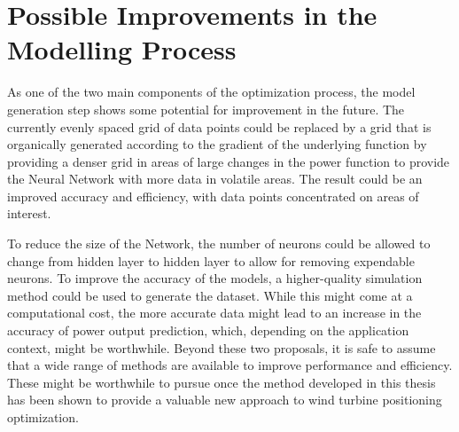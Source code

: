 \section{Possible Improvements in the Modelling Process}

As one of the two main components of the optimization process, the model generation step shows some potential for improvement in the future. The currently evenly spaced grid of data points could be replaced by a grid that is organically generated according to the gradient of the underlying function by providing a denser grid in areas of large changes in the power function to provide the Neural Network with more data in volatile areas. The result could be an improved accuracy and efficiency, with data points concentrated on areas of interest.   

To reduce the size of the Network, the number of neurons could be allowed to change from hidden layer to hidden layer to allow for removing expendable neurons.  To improve the accuracy of the models, a higher-quality simulation method could be used to generate the dataset. While this might come at a computational cost, the more accurate data might lead to an increase in the  accuracy of power output prediction, which, depending on the application context, might be worthwhile. Beyond these two proposals, it is safe to assume that a wide range of methods are available to improve performance and efficiency. These might be worthwhile to pursue once the method developed in this thesis has been shown to provide a valuable new approach to wind turbine positioning optimization.
